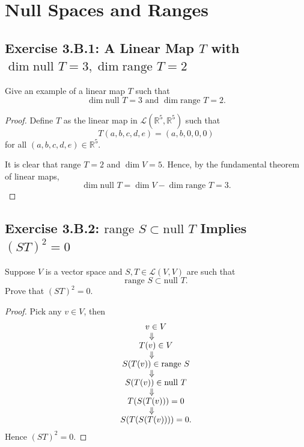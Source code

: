 \chapter{Null Spaces and Ranges}
\section{Exercise 3.B.1: A Linear Map $T$ with $\dim\text{null } T=3,\dim\text{range } T=2$}
Give an example of a linear map $T$ such that \[
\dim\text{null } T=3\text{ and }\dim\text{range } T=2.
\]
\begin{proof}
Define $T$ as the linear map in $\mathcal{L}(\mathbb{R}^5,\mathbb{R}^5)$ such that\[
T(a,b,c,d,e)=(a,b,0,0,0)
\]for all $(a,b,c,d,e)\in\mathbb{R}^5$.

It is clear that $\text{range }T=2$ and $\dim V=5$. Hence, by the fundamental theorem of linear maps,\[
\dim\text{null }T=\dim V-\dim\text{range }T=3.
\]
\end{proof}
\section{Exercise 3.B.2: $\text{range }S\subset\text{null }T$ Implies $(ST)^2=0$}
Suppose $V$ is a vector space and $S,T\in\mathcal{L}(V,V)$ are such that\[
\text{range }S\subset\text{null }T.
\]Prove that $(ST)^2=0$.
\begin{proof}
Pick any $v\in V$, then
\begin{gather*}
v\in V\\
\ArrowBetweenLines[\Downarrow]
T(v)\in V\\
\ArrowBetweenLines[\Downarrow]
S(T(v))\in\text{range } S\\
\ArrowBetweenLines[\Downarrow]
S(T(v))\in\text{null }T\\
\ArrowBetweenLines[\Downarrow]
T(S(T(v)))=0\\
\ArrowBetweenLines[\Downarrow]
S(T(S(T(v))))=0.
\end{gather*}
Hence $(ST)^2=0$.
\end{proof}

